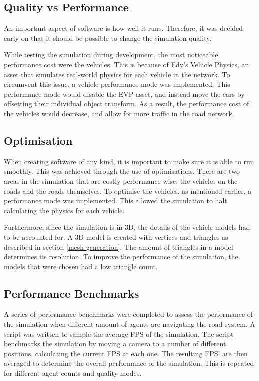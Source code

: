     \subsection{Quality vs Performance}
        An important aspect of software is how well it runs. Therefore, it was decided early on that it should be possible to change the simulation quality.
    
        While testing the simulation during development, the most noticeable performance cost were the vehicles. This is because of Edy's Vehicle Physics, an asset that simulates real-world physics for each vehicle in the network. To circumvent this issue, a vehicle performance mode was implemented. This performance mode would disable the EVP asset, and instead move the cars by offsetting their individual object transform. As a result, the performance cost of the vehicles would decrease, and allow for more traffic in the road network.
    
    \subsection{Optimisation} 
        When creating software of any kind, it is important to make sure it is able to run smoothly. This was achieved through the use of optimisations. There are two areas in the simulation that are costly performance-wise: the vehicles on the roads and the roads themselves. To optimise the vehicles, as mentioned earlier, a performance mode was implemented. This allowed the simulation to halt calculating the physics for each vehicle. 
    
        Furthermore, since the simulation is in 3D, the details of the vehicle models had to be accounted for. A 3D model is created with vertices and triangles as described in section \ref{mesh-generation}. The amount of triangles in a model determines its resolution. To improve the performance of the simulation, the models that were chosen had a low triangle count.

    \subsection{Performance Benchmarks} \label{performance-method}
        A series of performance benchmarks were completed to assess the performance of the simulation when different amount of agents are navigating the road system. A script was written to sample the average FPS of the simulation. The script benchmarks the simulation by moving a camera to a number of different positions, calculating the current FPS at each one. The resulting FPS' are then averaged to determine the overall performance of the simulation. This is repeated for different agent counts and quality modes. 

